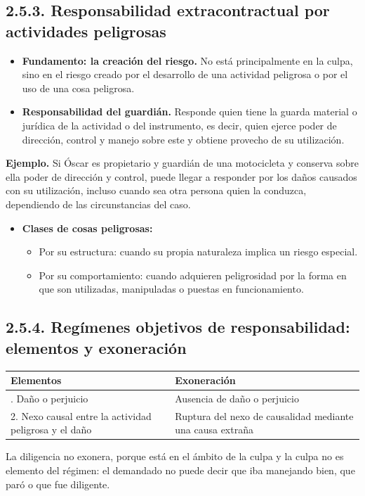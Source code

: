 \subsection{2.5.3. Responsabilidad extracontractual por actividades peligrosas}
\begin{itemize}
\item \textbf{Fundamento: la creación del riesgo.} No está principalmente en la culpa, sino en el riesgo creado por el desarrollo de una actividad peligrosa o por el uso de una cosa peligrosa.
\item \textbf{Responsabilidad del guardián.} Responde quien tiene la guarda material o jurídica de la actividad o del instrumento, es decir, quien ejerce poder de dirección, control y manejo sobre este y obtiene provecho de su utilización.
\end{itemize}
\begin{ejemplo}
\textcolor[HTML]{4F6228}{\textbf{Ejemplo. }}Si Óscar es propietario y guardián de una motocicleta y conserva sobre ella poder de dirección y control, puede llegar a responder por los daños causados con su utilización, incluso cuando sea otra persona quien la conduzca, dependiendo de las circunstancias del caso.
\end{ejemplo}
\begin{itemize}
\item \textbf{Clases de cosas peligrosas:}
\begin{itemize}
\item Por su estructura: cuando su propia naturaleza implica un riesgo especial.
\item Por su comportamiento: cuando adquieren peligrosidad por la forma en que son utilizadas, manipuladas o puestas en funcionamiento.
\end{itemize}
\end{itemize}
\subsection{2.5.4. Regímenes objetivos de responsabilidad: elementos y exoneración}
\begin{tabla}
\begin{longtable}{|>{\raggedright\arraybackslash}m{}|>{\raggedright\arraybackslash}m{}|}
\hline
\cellcolor[HTML]{1F3864}\textcolor[HTML]{FFFFFF}{\textbf{Elementos}} & \cellcolor[HTML]{1F3864}\textcolor[HTML]{FFFFFF}{\textbf{Exoneración}} \\ \hline
1. Daño o perjuicio & Ausencia de daño o perjuicio \\ \hline
\cellcolor[HTML]{F2F5FA}2. Nexo causal entre la actividad peligrosa y el daño & \cellcolor[HTML]{F2F5FA}Ruptura del nexo de causalidad mediante una causa extraña \\ \hline
\end{longtable}
\end{tabla}
La diligencia no exonera, porque está en el ámbito de la culpa y la culpa no es elemento del régimen: el demandado no puede decir que iba manejando bien, que paró o que fue diligente.

